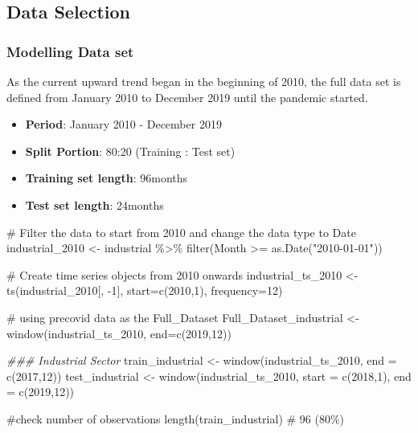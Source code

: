 \documentclass[
  letterpaper,
  DIV=11,
  numbers=noendperiod]{scrartcl}
\newenvironment{Shaded}{\begin{snugshade}}{\end{snugshade}}
\newcommand{\AttributeTok}[1]{\textcolor[rgb]{0.40,0.45,0.13}{#1}}
\newcommand{\CommentTok}[1]{\textcolor[rgb]{0.37,0.37,0.37}{#1}}
\newcommand{\DecValTok}[1]{\textcolor[rgb]{0.68,0.00,0.00}{#1}}
\newcommand{\DocumentationTok}[1]{\textcolor[rgb]{0.37,0.37,0.37}{\textit{#1}}}
\newcommand{\FunctionTok}[1]{\textcolor[rgb]{0.28,0.35,0.67}{#1}}
\newcommand{\NormalTok}[1]{\textcolor[rgb]{0.00,0.23,0.31}{#1}}
\newcommand{\OtherTok}[1]{\textcolor[rgb]{0.00,0.23,0.31}{#1}}
\newcommand{\SpecialCharTok}[1]{\textcolor[rgb]{0.37,0.37,0.37}{#1}}
\newcommand{\StringTok}[1]{\textcolor[rgb]{0.13,0.47,0.30}{#1}}
\begin{document}
\subsection{Data Selection}\label{data-selection}

\subsubsection{Modelling Data set}\label{modelling-data-set}

As the current upward trend began in the beginning of 2010, the full
data set is defined from January 2010 to December 2019 until the
pandemic started.

\begin{itemize}
\item
  \textbf{Period}: January 2010 - December 2019
\item
  \textbf{Split Portion}: 80:20 (Training : Test set)
\item
  \textbf{Training set length}: 96months
\item
  \textbf{Test set length}: 24months
\end{itemize}

\begin{Shaded}
\begin{Highlighting}[]
\CommentTok{\# Filter the data to start from 2010 and change the data type to Date}
\NormalTok{industrial\_2010 }\OtherTok{\textless{}{-}}\NormalTok{ industrial }\SpecialCharTok{\%\textgreater{}\%}
  \FunctionTok{filter}\NormalTok{(Month }\SpecialCharTok{\textgreater{}=} \FunctionTok{as.Date}\NormalTok{(}\StringTok{"2010{-}01{-}01"}\NormalTok{))}

\CommentTok{\# Create time series objects from 2010 onwards}
\NormalTok{industrial\_ts\_2010 }\OtherTok{\textless{}{-}} \FunctionTok{ts}\NormalTok{(industrial\_2010[, }\SpecialCharTok{{-}}\DecValTok{1}\NormalTok{], }\AttributeTok{start=}\FunctionTok{c}\NormalTok{(}\DecValTok{2010}\NormalTok{,}\DecValTok{1}\NormalTok{), }\AttributeTok{frequency=}\DecValTok{12}\NormalTok{)}

\CommentTok{\# using precovid data as the Full\_Dataset}
\NormalTok{Full\_Dataset\_industrial }\OtherTok{\textless{}{-}} \FunctionTok{window}\NormalTok{(industrial\_ts\_2010, }\AttributeTok{end=}\FunctionTok{c}\NormalTok{(}\DecValTok{2019}\NormalTok{,}\DecValTok{12}\NormalTok{))}


\DocumentationTok{\#\#\# Industrial Sector}
\NormalTok{train\_industrial }\OtherTok{\textless{}{-}} \FunctionTok{window}\NormalTok{(industrial\_ts\_2010, }\AttributeTok{end =} \FunctionTok{c}\NormalTok{(}\DecValTok{2017}\NormalTok{,}\DecValTok{12}\NormalTok{))}
\NormalTok{test\_industrial }\OtherTok{\textless{}{-}} \FunctionTok{window}\NormalTok{(industrial\_ts\_2010, }\AttributeTok{start =} \FunctionTok{c}\NormalTok{(}\DecValTok{2018}\NormalTok{,}\DecValTok{1}\NormalTok{), }\AttributeTok{end =} \FunctionTok{c}\NormalTok{(}\DecValTok{2019}\NormalTok{,}\DecValTok{12}\NormalTok{))}

\CommentTok{\#check number of observations}
\FunctionTok{length}\NormalTok{(train\_industrial) }\CommentTok{\# 96 (80\%)}
\end{Highlighting}
\end{Shaded}
\end{document}
